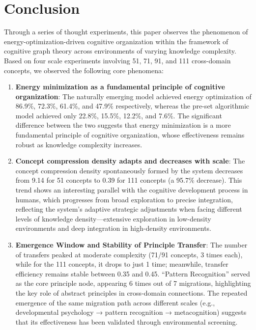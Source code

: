 \documentclass[10pt,onecolumn]{article}
\begin{document}
\section{Conclusion}

Through a series of thought experiments, this paper observes the phenomenon of energy-optimization-driven cognitive organization within the framework of cognitive graph theory across environments of varying knowledge complexity. Based on four scale experiments involving 51, 71, 91, and 111 cross-domain concepts, we observed the following core phenomena:

\begin{enumerate}
    \item \textbf{Energy minimization as a fundamental principle of cognitive organization}: The naturally emerging model achieved energy optimization of 86.9\%, 72.3\%, 61.4\%, and 47.9\% respectively, whereas the pre-set algorithmic model achieved only 22.8\%, 15.5\%, 12.2\%, and 7.6\%. The significant difference between the two suggests that energy minimization is a more fundamental principle of cognitive organization, whose effectiveness remains robust as knowledge complexity increases.

    \item \textbf{Concept compression density adapts and decreases with scale}: The concept compression density spontaneously formed by the system decreases from 9.14 for 51 concepts to 0.39 for 111 concepts (a 95.7\% decrease). This trend shows an interesting parallel with the cognitive development process in humans, which progresses from broad exploration to precise integration, reflecting the system’s adaptive strategic adjustments when facing different levels of knowledge density—extensive exploration in low-density environments and deep integration in high-density environments.

    \item \textbf{Emergence Window and Stability of Principle Transfer}: The number of transfers peaked at moderate complexity (71/91 concepts, 3 times each), while for the 111 concepts, it drops to just 1 time; meanwhile, transfer efficiency remains stable between 0.35 and 0.45. “Pattern Recognition” served as the core principle node, appearing 6 times out of 7 migrations, highlighting the key role of abstract principles in cross-domain connections. The repeated emergence of the same migration path across different scales (e.g., developmental psychology → pattern recognition → metacognition) suggests that its effectiveness has been validated through environmental screening.


\end{enumerate}
\end{document}
